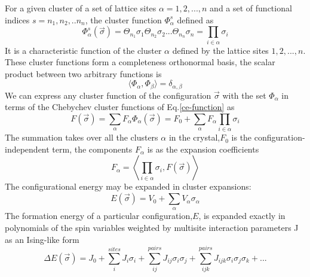 \documentclass[aps,preprint,amsmath,amssymb]{revtex4}
\begin{document}
For a given cluster of a set of lattice sites $\alpha={1,2,...,n}$
and a set of functional indices $s={n_{1},n_{2},..n_{n}}$, the cluster function $\Phi_{\alpha}^{s}$ defined as
\begin{equation}\label{ce-function}
  \Phi_{\alpha}^{s}(\vec{\sigma})=\Theta_{n_{1}}\sigma_{1}\Theta_{n_{2}}\sigma_{2}...\Theta_{n_{n}}\sigma_{n}=\prod_{i\in\alpha}\sigma_{i}
\end{equation}
It is a characteristic function of the cluster $\alpha$ defined by the lattice sites ${1,2,...,n}$.
These cluster functions form a completeness orthonormal basis, the scalar product between two arbitrary functions is
\begin{equation}\label{scalar-product}
  \langle\Phi_{\alpha},\Phi_{\beta}\rangle=\delta_{\alpha,\beta}
\end{equation}
We can express any cluster function of the configuration $\vec{\sigma}$
with the set $\Phi_{\alpha}$ in terms of the Chebychev cluster functions of Eq.\ref{ce-function}\cite{Wolverton1994} as
\begin{equation}\label{function}
  F(\vec{\sigma})=\sum_{\alpha}F_{\alpha}\Phi_{\alpha}(\vec{\sigma})=F_{0}+\sum_{\alpha}F_{\alpha}\prod_{i\in\alpha}\sigma_{i}
\end{equation}
The summation takes over all the clusters $\alpha$ in the crystal,$F_{0}$ is the configuration-independent term,
the components $F_{\alpha}$ is as the expansion coefficients
\begin{equation}\label{coefficients}
  F_{\alpha}=\left\langle\prod_{i\in\alpha}\sigma_{i},F(\vec{\sigma})\right\rangle
\end{equation}
The configurational energy may be expanded in cluster expansions:
\begin{equation}\label{configuration-energy}
  E(\vec{\sigma})=V_{0}+\sum_{\alpha}V_{\alpha}\sigma_{\alpha}
\end{equation}
The formation energy of a particular configuration,$E$, is expanded exactly in polynomials of the spin variables weighted by
multisite interaction parameters {J} as an Ising-like form\cite{Herder2015}
\begin{equation}\label{energy-expanded}
  \Delta E(\vec{\sigma})=J_{0}+\sum_{i}^{sites}J_{i}\sigma_{i}+\sum_{ij}^{pairs}J_{ij}\sigma_{i}\sigma_{j}+\sum_{ijk}^{pairs}J_{ijk}\sigma_{i}\sigma_{j}\sigma_{k}+...
\end{equation}
\end{document}
